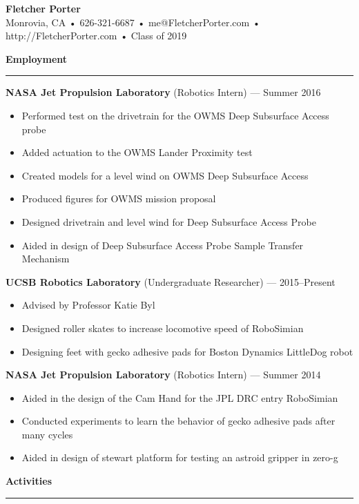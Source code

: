 \documentclass[12pt, oneside]{article}
\newcommand{\titlestyle}[1] {
	{\fontsize{50pt}{1em}\selectfont \bf \textcolor{new_red}{#1}} \\
}
\newcommand{\headingstyleJobs}[1] {
	{\fontsize{20pt}{1em}\selectfont \bf \textcolor{new_red}{#1}}
	\textcolor{new_red}{\rule{3.25in}{0.5pt}} \vspace{3pt}
}
\newcommand{\infostyle}[1] {
	{\fontsize{10pt}{1em}\selectfont #1} \\ \vspace{9pt}
}
\newcommand{\jobtitle}[2] {
	{\bf #1} {#2} \vspace{-10pt} \\
}
\begin{document}
\begin{flushleft}


\titlestyle{Fletcher Porter}
\infostyle{Monrovia, CA • 626-321-6687 • me@FletcherPorter.com • http://FletcherPorter.com • Class of 2019}

\headingstyleJobs{Employment}

\jobtitle{NASA Jet Propulsion Laboratory}{(Robotics Intern) — Summer 2016}
\begin{itemize}
	\item Performed test on the drivetrain for the OWMS Deep Subsurface Access probe
	\item Added actuation to the OWMS Lander Proximity test
	\item Created models for a level wind on OWMS Deep Subsurface Access
	\item Produced figures for OWMS mission proposal
	\item Designed drivetrain and level wind for Deep Subsurface Access Probe
	\item Aided in design of Deep Subsurface Access Probe Sample Transfer Mechanism
\end{itemize}

\jobtitle{UCSB Robotics Laboratory}{(Undergraduate Researcher) — 2015–Present}
\begin{itemize}
	\item Advised by Professor Katie Byl
	\item Designed roller skates to increase locomotive speed of RoboSimian
	\item Designing feet with gecko adhesive pads for Boston Dynamics LittleDog robot
\end{itemize}

\jobtitle{NASA Jet Propulsion Laboratory}{(Robotics Intern) — Summer 2014}
\begin{itemize}
	\item Aided in the design of the Cam Hand for the JPL DRC entry RoboSimian
	\item Conducted experiments to learn the behavior of gecko adhesive pads after many cycles
	\item Aided in design of stewart platform for testing an astroid gripper in zero-g
\end{itemize}


\headingstyleJobs{Activities}


\end{flushleft}
\end{document}
